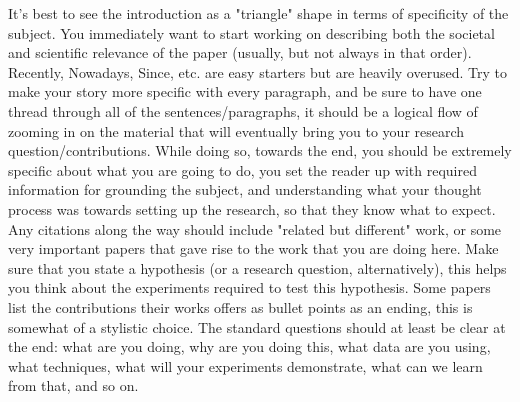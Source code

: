 It's best to see the introduction as a "triangle" shape in terms of specificity of the subject. You immediately want to start working on describing both the societal and scientific relevance of the paper (usually, but not always in that order). Recently, Nowadays, Since, etc. are easy starters but are heavily overused. Try to make your story more specific with every paragraph, and be sure to have one thread through all of the sentences/paragraphs, it should be a logical flow of zooming in on the material that will eventually bring you to your research question/contributions. While doing so, towards the end, you should be extremely specific about what you are going to do, you set the reader up with required information for grounding the subject, and understanding what your thought process was towards setting up the research, so that they know what to expect. Any citations along the way should include "related but different" work, or some very important papers that gave rise to the work that you are doing here. Make sure that you state a hypothesis (or a research question, alternatively), this helps you think about the experiments required to test this hypothesis. Some papers list the contributions their works offers as bullet points as an ending, this is somewhat of a stylistic choice. The standard questions should at least be clear at the end: what are you doing, why are you doing this, what data are you using, what techniques, what will your experiments demonstrate, what can we learn from that, and so on.

